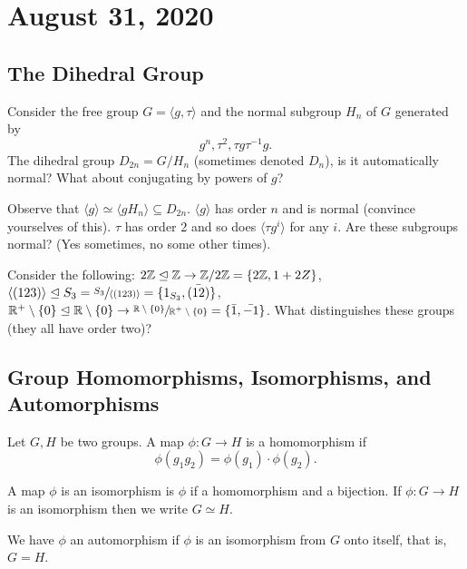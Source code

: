 \section{August 31, 2020}

\subsection{The Dihedral Group}
\begin{example}
    Consider the free group $G=\langle g, \tau \rangle $ and the normal subgroup $H_n$ of $G$ generated by \[
    g^{n},\tau^2, \tau g \tau^{-1}g.
    \]
    The dihedral group $D_{2n}=G/H_n$ (sometimes denoted $D_n$), is it automatically normal? What about conjugating by powers of $g$?
\end{example}

Observe that $\langle g \rangle \simeq \langle gH_n \rangle  \subseteq D_{2n}$. $\langle g \rangle $ has order $n$ and is normal (convince yourselves of this). $\tau$ has order 2 and so does $\langle \tau g^{i} \rangle $ for any $i$. Are these subgroups normal? (Yes sometimes, no some other times).

Consider the following: $2\mathbb{Z} \trianglelefteq \mathbb{Z} \to \mathbb{Z} /2\mathbb{Z}= \{2\mathbb{Z}, 1+2Z\}$, $\langle (123) \rangle \trianglelefteq S_3 = \sfrac{S_3}{\langle (123) \rangle} = \{1_{S_3},\bar{(12)}\} $, $\mathbb{R}^{+} \setminus \{0\} \trianglelefteq \mathbb{R}\setminus \{0\} \to \sfrac{\mathbb{R}\setminus \{0\}}{ \mathbb{R}^{+}\setminus \{0\}}=\{\bar{1},\bar{-1}\} $. What distinguishes these groups (they all have order two)?

\subsection{Group Homomorphisms, Isomorphisms, and Automorphisms}
\begin{definition}[Homomorphisms]
    Let $G, H$ be two groups. A map $ \phi \colon G \to H$ is a homomorphism if \[
        \phi (g_1g_2)=\phi(g_1)\cdot \phi(g_2).
    \]
    
\end{definition}
\begin{definition}[Isomorphism]
    A map $\phi$ is an isomorphism is $\phi$ if a homomorphism and a bijection. If $ \phi \colon G \to H$ is an isomorphism then we write $G \simeq H$.
\end{definition}
\begin{definition}[Automorphism]
    We have $\phi$ an automorphism if $\phi$ is an isomorphism from $G$ onto itself, that is, $G=H$.
\end{definition}

